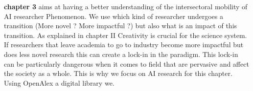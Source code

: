 \textbf{chapter 3} aims at having a better understanding of the intersectoral mobility of AI researcher Phenomenon. We use  which kind of researcher undergoes a transition (More novel ? More impactful ?)  but also what is an impact of this transition. As explained in chapter II Creativity is crucial for the science system. If researchers that leave academia to go to industry become more impactful but does less novel research this can create a lock-in in the paradigm. This lock-in can be particularly dangerous when it comes to field that are pervasive and affect the society as a whole. This is why we focus on AI research for this chapter. Using OpenAlex a digital library we.

